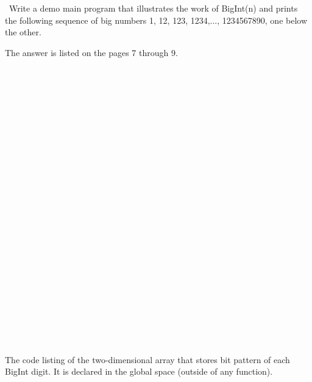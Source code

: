 \documentclass{article}
\begin{document}
	\rmfamily\
	Write a demo main program that illustrates the work of BigInt(n) and prints the following sequence of big numbers 1, 12, 123, 1234,..., 1234567890, one below the other.
	\newline
	
	The answer is listed on the pages 7 through 9.
	
	
\paragraph{}\
\paragraph{}\
\paragraph{}\
\paragraph{}\
\paragraph{}\
\paragraph{}\
\paragraph{}\
\paragraph{}\
\paragraph{}\
\paragraph{}\
\paragraph{}\
\paragraph{}\

	
	\noindent The code listing of the two-dimensional array that stores bit pattern of each BigInt digit. It is declared in the global space (outside of any function).
	
\end{document}
